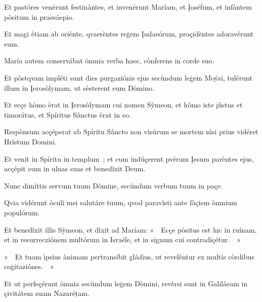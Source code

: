 Et pastóres venérunt festinàntes, et invenérunt Maríam, et Įoséfum, et infàntem pòsitum in praesáepio. 

Et magi ètiam ab oriènte, qvaerèntes reģem Įudaeórum, proçidèntes adoravérunt eum. 

María autem conservábat òmnia verba haec, cònferens in corde suo. 


Et pòstqvam impléti sunt dies purgaziónis eįus secùndum leģem Moýsi, tulérunt illum in Įerosòlymam, ut sèsterent eum Dòmino. 

Et ecçe hòmo èrat in Įerosòlymam cui nomen Sỳmeon, et hòmo iste įûstus et timorátus, et Spíritus Sânctus èrat in eo. 

Respònsum acçéperat ab Spíritu Sâncto non visúrum se mortem nìsi prius vidéret Hrîstum Domini. 

Et venit in Spíritu in templum~; et cum indúçerent pvèrum Įesum parèntes eįus, acçépit eum in ulnas suas et benedîxit Deum. 

Nunc dimìttis servum tuum Dòmine, secùndum verbum tuum in paçe. 

Qvia vidérunt òculi mei salutáre tuum, qvod paravìsti ante fàçiem òmnium populórum. 

Et benedîxit illis Sỳmeon, et dîxit ad Maríam: «~~Ecçe pòsitus est hic in ruínam, et in resurrecziónem multórum in Israéle, et in signum cui contradiçétur.~~» 

«~~Et tuam ìpsius ànimam pertransíbit gládius, ut revelèntur ex multis còrdibus coģitaziónes.~~» 

Et ut perfeçérunt òmnia secùndum leģem Dòmini, revèrsi sunt in Galiláeam in çivitátem suam Nazaréțam. 

